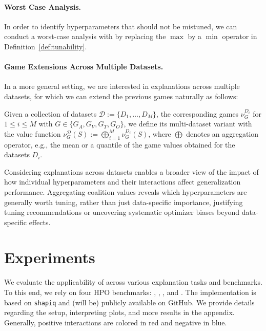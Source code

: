 \documentclass[letterpaper]{article} %
\begin{document}
\paragraph{Worst Case Analysis.}
In order to identify hyperparameters that should not be mistuned, we can conduct a worst-case analysis with \tool by replacing the $\max$ by a $\min$ operator in Definition~\ref{def:tunability}.

\paragraph{Game Extensions Across Multiple Datasets.} 
In a more general setting, we are interested in explanations across multiple datasets, for which we can extend the previous games naturally as follows:

\begin{definition}
Given a collection of datasets $\mathcal D := \{D_1, \dots, D_M\}$, the corresponding games $\nu^{D_i}_{G}$ for $1 \leq i \leq M$ with $G \in \{G_A,G_V,G_T,G_O\}$, we define its multi-dataset variant with the value function
$\nu^{\mathcal D}_{G}(S) := \bigoplus_{i = 1 }^M \nu^{D_i}_G(S)$,
where $\bigoplus$ denotes an aggregation operator, e.g., the mean or a quantile of the game values obtained for the datasets $D_i$.
\end{definition}

Considering explanations across datasets enables a broader view of the impact of how individual hyperparameters and their interactions affect generalization performance. Aggregating coalition values reveals which hyperparameters are generally worth tuning, rather than just data-specific importance, justifying tuning recommendations or uncovering systematic optimizer biases beyond data-specific effects.

\section{Experiments}\label{sec_experiments}

We evaluate the applicability of \tool across various explanation tasks and benchmarks.
To this end, we rely on four HPO benchmarks: \lcbench \citep{zimmer-tpami21a}, \rbvranger \citep{DBLP:conf/automl/PfistererSMBB22}, \pdone \citep{wang-jmlr24}, and \jahs \citep{bansal-neurips22a}. The implementation is based on \texttt{shapiq} \cite{Muschalik.2024} and (will be) publicly available on GitHub\footnotemark[1]. We provide details regarding the setup, interpreting plots, and more results in the appendix. Generally, positive interactions are colored in red and negative in blue.
\end{document}

